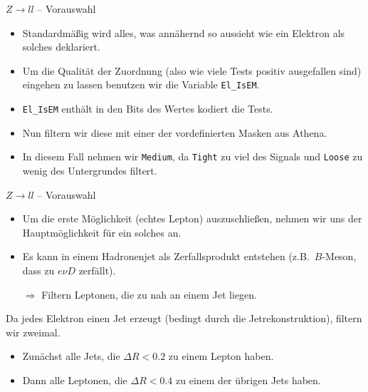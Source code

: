\documentclass{beamer}
\begin{document}
\begin{frame}{$Z \to ll$ -- Vorauswahl}
  \begin{itemize}
    \item Standardmäßig wird alles, was annähernd so aussieht wie ein Elektron
      als solches deklariert. \pause

    \item Um die Qualität der Zuordnung (also wie viele Tests positiv
      ausgefallen sind) eingehen zu lassen benutzen wir die Variable
      \lstinline'El_IsEM'. \pause

    \item \lstinline'El_IsEM' enthält in den Bits des Wertes kodiert die Tests.
      \pause

    \item Nun filtern wir diese mit einer der vordefinierten Masken aus Athena.
      \pause

    \item In diesem Fall nehmen wir \lstinline'Medium', da \lstinline'Tight' zu
      viel des Signals und \lstinline'Loose' zu wenig des Untergrundes filtert.
  \end{itemize}
\end{frame}

\begin{frame}{$Z \to ll$ -- Vorauswahl}
  \begin{itemize}
    \item Um die erste Möglichkeit (echtes Lepton) auszuschließen, nehmen wir
      uns der Hauptmöglichkeit für ein solches an.

    \item Es kann in einem Hadronenjet als Zerfallsprodukt entstehen (z.B.\
      $B$-Meson, dass zu $e\nu D$ zerfällt). \pause

    \item[$\Rightarrow$] Filtern Leptonen, die zu nah an einem Jet liegen.
  \end{itemize} \pause

  Da jedes Elektron einen Jet erzeugt (bedingt durch die Jetrekonstruktion),
  filtern wir zweimal.

  \begin{itemize}
    \item Zunächst alle Jets, die $\Delta R < 0.2$ zu einem Lepton haben.
    \item Dann alle Leptonen, die $\Delta R < 0.4$ zu einem der übrigen Jets haben.
  \end{itemize}
\end{frame}
\end{document}
